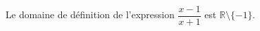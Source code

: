 Le domaine de définition de l'expression $\dfrac{x-1}{x+1}$ est $\mathbb R \setminus \{-1\}$.

\begin{reponses}
\end{reponses}

